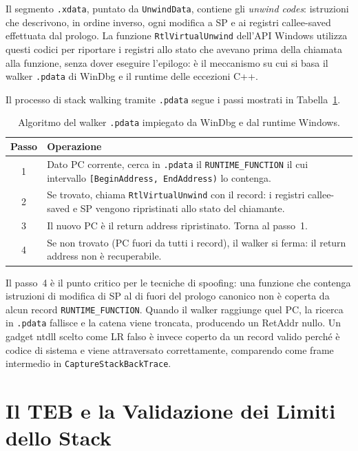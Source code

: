 Il segmento \texttt{.xdata}, puntato da \texttt{UnwindData}, contiene gli
\emph{unwind codes}: istruzioni che descrivono, in ordine inverso, ogni
modifica a SP e ai registri callee-saved effettuata dal prologo. La funzione
\texttt{RtlVirtualUnwind} dell'API Windows utilizza questi codici per riportare
i registri allo stato che avevano prima della chiamata alla funzione, senza
dover eseguire l'epilogo: è il meccanismo su cui si basa il walker
\texttt{.pdata} di WinDbg e il runtime delle eccezioni C++.

Il processo di stack walking tramite \texttt{.pdata} segue i passi mostrati
in Tabella~\ref{tab:pdata-walk}.

\begin{table}[H]
\centering
\begin{tabular}{cp{10cm}}
\toprule
Passo & Operazione \\
\midrule
1 & Dato PC corrente, cerca in \texttt{.pdata} il \texttt{RUNTIME\_FUNCTION}
    il cui intervallo \texttt{[BeginAddress, EndAddress)} lo contenga. \\
2 & Se trovato, chiama \texttt{RtlVirtualUnwind} con il record: i registri
    callee-saved e SP vengono ripristinati allo stato del chiamante. \\
3 & Il nuovo PC è il return address ripristinato. Torna al passo~1. \\
4 & Se non trovato (PC fuori da tutti i record), il walker si ferma: il
    return address non è recuperabile. \\
\bottomrule
\end{tabular}
\caption{Algoritmo del walker \texttt{.pdata} impiegato da WinDbg e dal runtime Windows.}
\label{tab:pdata-walk}
\end{table}

Il passo~4 è il punto critico per le tecniche di spoofing: una funzione che
contenga istruzioni di modifica di SP al di fuori del prologo canonico non è
coperta da alcun record \texttt{RUNTIME\_FUNCTION}. Quando il walker raggiunge
quel PC, la ricerca in \texttt{.pdata} fallisce e la catena viene troncata,
producendo un RetAddr nullo. Un gadget ntdll scelto come LR falso è invece
coperto da un record valido perché è codice di sistema e viene attraversato
correttamente, comparendo come frame intermedio in \texttt{CaptureStackBackTrace}.


\section{Il TEB e la Validazione dei Limiti dello Stack}
\label{sec:teb}

